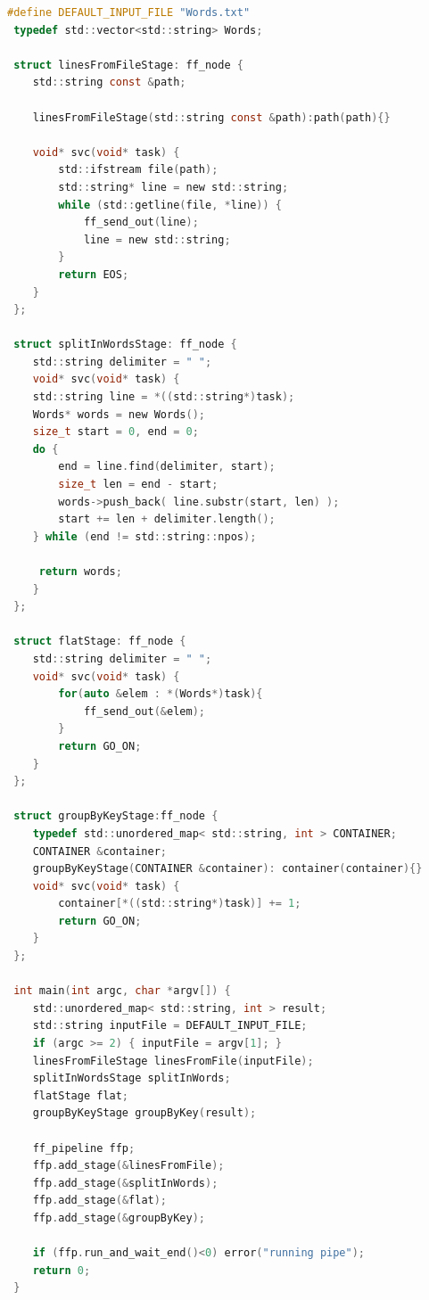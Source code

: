 \begin{lstlisting}[language=c, frame=single, caption={Le code source FastFlow d'une application de d\'ecompte du nombre d'occurrences des mots.},captionpos=b]
 #define DEFAULT_INPUT_FILE "Words.txt"
 typedef std::vector<std::string> Words;
 
 struct linesFromFileStage: ff_node {
 	std::string const &path;
 
 	linesFromFileStage(std::string const &path):path(path){}
 
	void* svc(void* task) {
		std::ifstream file(path);
		std::string* line = new std::string;
		while (std::getline(file, *line)) {
			ff_send_out(line);
			line = new std::string;
		}
		return EOS;
	}
 };
 
 struct splitInWordsStage: ff_node {
	std::string delimiter = " ";
	void* svc(void* task) {
	std::string line = *((std::string*)task);
	Words* words = new Words();
	size_t start = 0, end = 0;
	do {
		end = line.find(delimiter, start);
		size_t len = end - start;
		words->push_back( line.substr(start, len) );
		start += len + delimiter.length();
	} while (end != std::string::npos);

	 return words;
	}
 };
 
 struct flatStage: ff_node {
    std::string delimiter = " ";
 	void* svc(void* task) {
 	    for(auto &elem : *(Words*)task){
 	    	ff_send_out(&elem);
 	    }
 		return GO_ON;
 	}
 };
 
 struct groupByKeyStage:ff_node {
 	typedef std::unordered_map< std::string, int > CONTAINER;
 	CONTAINER &container;
 	groupByKeyStage(CONTAINER &container): container(container){}
 	void* svc(void* task) {
 		container[*((std::string*)task)] += 1;
 		return GO_ON;
    }
 };
 
 int main(int argc, char *argv[]) {
 	std::unordered_map< std::string, int > result;
 	std::string inputFile = DEFAULT_INPUT_FILE;
	if (argc >= 2) { inputFile = argv[1]; } 
	linesFromFileStage linesFromFile(inputFile);
	splitInWordsStage splitInWords;
	flatStage flat;
	groupByKeyStage groupByKey(result);

	ff_pipeline ffp;
	ffp.add_stage(&linesFromFile);
	ffp.add_stage(&splitInWords);
	ffp.add_stage(&flat);
	ffp.add_stage(&groupByKey);

	if (ffp.run_and_wait_end()<0) error("running pipe");
 	return 0;
 }
\end{lstlisting}
\label{wordcountFastFlow}


